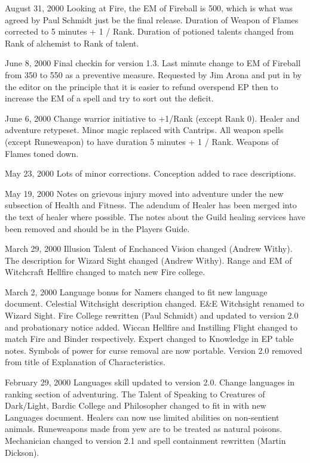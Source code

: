 \begin{edition}{1.3}
\item[August 31, 2000] Looking at Fire, the EM of Fireball is 500,
which is what was agreed by Paul Schmidt just be the final release.
Duration of Weapon of Flames corrected to 5 minutes + 1 / Rank.
Duration of potioned talents changed from Rank of alchemist to
Rank of talent.

\item[June 8, 2000] Final checkin for version 1.3.  Last minute
change to EM of Fireball from 350 to 550 as a preventive measure.
Requested by Jim Arona and put in by the editor on the principle
that it is easier to refund overspend EP then to increase the
EM of a spell and try to sort out the deficit.

\item[June 6, 2000] Change warrior initiative to +1/Rank (except Rank
0).  Healer and adventure retypeset.  Minor magic replaced with
Cantrips.  All weapon spells (except Runeweapon) to have duration 5
minutes + 1 / Rank.  Weapons of Flames toned down.

\item[May 23, 2000] Lots of minor corrections.  Conception added
to race descriptions.

\item[May 19, 2000] Notes on grievous injury moved into adventure
under the new subsection of Health and Fitness.  The adendum of Healer
has been merged into the text of healer where possible.  The notes
about the Guild healing services have been removed and should be in
the Players Guide.

\item[March 29, 2000] Illusion Talent of Enchanced Vision changed
(Andrew Withy).  The description for Wizard Sight changed (Andrew
Withy).  Range and EM of Witchcraft Hellfire changed to match new
Fire college.

\item[March 2, 2000] Language bonus for Namers changed to fit new
language document.  Celestial Witchsight description changed.  E\&E
Witchsight renamed to Wizard Sight.  Fire College rewritten (Paul
Schmidt) and updated to version 2.0 and probationary notice added.
Wiccan Hellfire and Instilling Flight changed to match Fire and Binder
respectively.  Expert changed to Knowledge in EP table notes.  Symbols
of power for curse removal are now portable.  Version 2.0 removed from
title of Explanation of Characteristics.

\item[February 29, 2000] Languages skill updated to version 2.0.
Change languages in ranking section of adventuring.  The Talent of
Speaking to Creatures of Dark/Light, Bardic College and Philosopher
changed to fit in with new Languages document.  Healers can now use
limited abilities on non-sentient animals.  Runeweapons made from yew
are to be treated as natural poisons.  Mechanician changed to version
2.1 and spell containment rewritten (Martin Dickson).


\end{edition}
